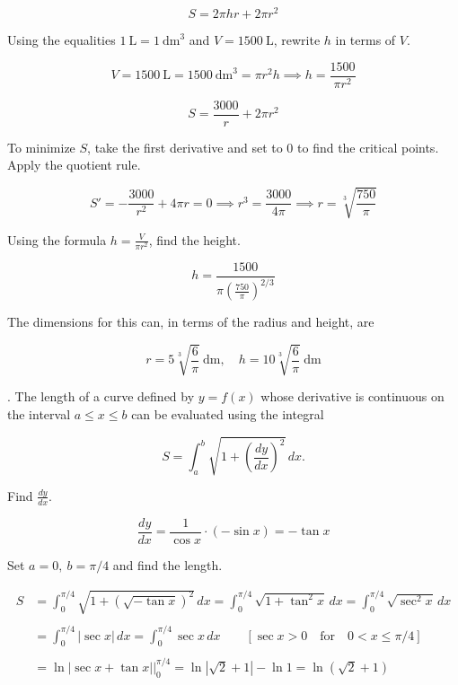 \documentclass{article}
\begin{document}
\[S=2\pi hr+2\pi r^2\]

\hfill

\noindent Using the equalities $1\:\text{L}=1\:\text{dm}^3$ and $V=1500\:\text{L}$, rewrite $h$ in terms of $V$.

\[V=1500\:\text{L}=1500\:\text{dm}^3=\pi r^2h\implies h=\frac{1500}{\pi r^2}\]

\[S=\frac{3000}r+2\pi r^2\]

\hfill

\noindent To minimize $S$, take the first derivative and set to $0$ to find the critical points. Apply the quotient rule.

\[S'=-\frac{3000}{r^2}+4\pi r=0\implies r^3=\frac{3000}{4\pi}\implies r=\sqrt[3]{\frac{750}{\pi}}\]

\hfill

\noindent Using the formula $\displaystyle h=\frac V{\pi r^2}$, find the height.

\[h=\frac{1500}{\pi\left(\frac{750}{\pi}\right)^{2/3}}\]

\hfill

\noindent The dimensions for this can, in terms of the radius and height, are

\[\boxed{r=5\sqrt[3]{\frac{6}\pi}\:\text{dm},\quad h=10\sqrt[3]{\frac6\pi}\:\text{dm}}\]

\newpage

. The length of a curve defined by $y=f(x)$ whose derivative is continuous on the interval $a\leq x\leq b$ can be evaluated using the integral

\[S=\int_a^b\sqrt{1+\left(\frac{dy}{dx}\right)^2}\,dx.\]

\hfill

\noindent Find $\displaystyle\frac{dy}{dx}$.

\[\frac{dy}{dx}=\frac1{\cos x}\cdot (-\sin x)=-\tan x\]

\hfill

\noindent Set $a=0,\:b=\pi/4$ and find the length.

\begin{align*}S&=\int_0^{\pi/4}\sqrt{1+\left(\sqrt{-\tan x}\right)^2}\,dx=\int_0^{\pi/4}\sqrt{1+\tan^2x}\,dx=\int_0^{\pi/4}\sqrt{\sec^2x}\,dx\\\\&=\int_0^{\pi/4}\left|\sec x\right|\,dx=\int_0^{\pi/4}\sec x\,dx\qquad\left[\sec x>0\quad\text{for}\quad0<x\leq\pi/4\right]\\\\&=\ln\left|\sec x+\tan x\right|\bigg|_0^{\pi/4}=\ln\left|\sqrt2+1\right|-\ln1=\boxed{\ln\left(\sqrt2+1\right)}\end{align*}
\end{document}

